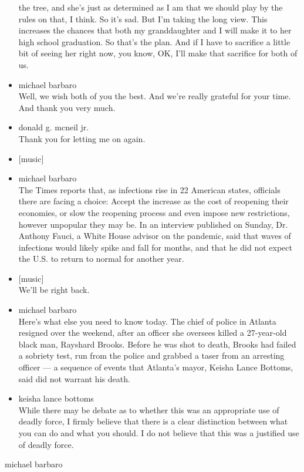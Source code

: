 \begin{itemize}
  the tree, and she's just as determined as I am that we should play by
  the rules on that, I think. So it's sad. But I'm taking the long view.
  This increases the chances that both my granddaughter and I will make
  it to her high school graduation. So that's the plan. And if I have to
  sacrifice a little bit of seeing her right now, you know, OK, I'll
  make that sacrifice for both of us.
\item
  michael barbaro\\
  Well, we wish both of you the best. And we're really grateful for your
  time. And thank you very much.
\item
  donald g. mcneil jr.\\
  Thank you for letting me on again.
\item
  {[}music{]}
\item
  michael barbaro\\
  The Times reports that, as infections rise in 22 American states,
  officials there are facing a choice: Accept the increase as the cost
  of reopening their economies, or slow the reopening process and even
  impose new restrictions, however unpopular they may be. In an
  interview published on Sunday, Dr. Anthony Fauci, a White House
  advisor on the pandemic, said that waves of infections would likely
  spike and fall for months, and that he did not expect the U.S. to
  return to normal for another year.
\item
  {[}music{]}\\
  We'll be right back.
\item
  michael barbaro\\
  Here's what else you need to know today. The chief of police in
  Atlanta resigned over the weekend, after an officer she oversees
  killed a 27-year-old black man, Rayshard Brooks. Before he was shot to
  death, Brooks had failed a sobriety test, run from the police and
  grabbed a taser from an arresting officer --- a sequence of events
  that Atlanta's mayor, Keisha Lance Bottoms, said did not warrant his
  death.
\item
  keisha lance bottoms\\
  While there may be debate as to whether this was an appropriate use of
  deadly force, I firmly believe that there is a clear distinction
  between what you can do and what you should. I do not believe that
  this was a justified use of deadly force.
\end{itemize}

michael barbaro

